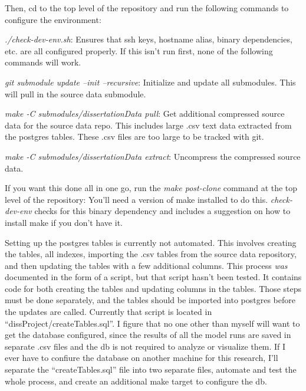 \documentclass[man,floatsintext,donotrepeattitle]{apa6}
\begin{document}
Then, cd to the top level of the repository and run the following commands to configure the environment:

\begin{singlespace}
\begin{compactitem} 
  \item \emph{./check-dev-env.sh}:
    Ensures that ssh keys, hostname alias, binary dependencies, etc. are all configured properly.
    If this isn't run first, none of the following commands will work.
  \item \emph{git submodule update --init --recursive}:
    Initialize and update all submodules.
    This will pull in the source data submodule.
  \item \emph{make -C submodules/dissertationData pull}:
    Get additional compressed source data for the source data repo.
    This includes large .csv text data extracted from the postgres tables.
    These .csv files are too large to be tracked with git.
  \item \emph{make -C submodules/dissertationData extract}:
    Uncompress the compressed source data.
\end{compactitem}
\end{singlespace}

If you want this done all in one go, run the \emph{make post-clone} command at the top level of the repository:
You'll need a version of make installed to do this.
\emph{check-dev-env} checks for this binary dependency and includes a suggestion on how to install make if you don't have it.


Setting up the postgres tables is currently not automated.
This involves creating the tables, all indexes, importing the .csv tables from the source data repository, and then updating the tables with a few additional columns.
This process \emph{was} documented in the form of a script, but that script hasn't been tested.
It contains code for both creating the tables and updating columns in the tables.
Those steps must be done separately, and the tables should be imported into postgres before the updates are called.
Currently that script is located in ``dissProject/createTables.sql''.
I figure that no one other than myself will want to get the database configured,
since the results of all the model runs are saved in separate .csv files and the db is not required to analyze or visualize them.
If I ever have to confiure the database on another machine for this research, I'll separate the ``createTables.sql'' file into two separate files, 
automate and test the whole process, and create an additional make target to configure the db.

\printbibliography[heading=bibintoc]
\end{document}

